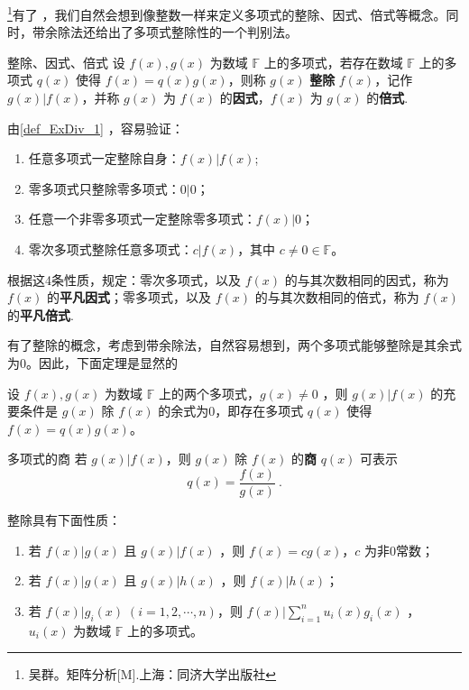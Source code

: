 

\footnote{吴群。矩阵分析[M].上海：同济大学出版社}有了 ，我们自然会想到像整数一样来定义多项式的整除、因式、倍式等概念。同时，带余除法还给出了多项式整除性的一个判别法。
\begin{definition}{整除、因式、倍式}\label{def_ExDiv_1}
设 $f(x),g(x)$ 为数域 $\mathbb{F}$ 上的多项式，若存在数域 $\mathbb{F}$ 上的多项式 $q(x)$ 使得 $f(x)=q(x)g(x)$，则称 $g(x)$ \textbf{整除} $f(x)$，记作 $g(x)|f(x)$，并称 $g(x)$ 为 $f(x)$ 的\textbf{因式}，$f(x)$ 为 $g(x)$ 的\textbf{倍式}.
\end{definition}
由\autoref{def_ExDiv_1} ，容易验证：
\begin{enumerate}
\item 任意多项式一定整除自身：$f(x)|f(x)$;
\item 零多项式只整除零多项式：$0|0$；
\item 任意一个非零多项式一定整除零多项式：$f(x)|0$；
\item 零次多项式整除任意多项式：$c|f(x)$，其中 $c\neq0\in\mathbb{F}$。
\end{enumerate}
根据这4条性质，规定：零次多项式，以及 $f(x)$ 的与其次数相同的因式，称为 $f(x)$ 的\textbf{平凡因式}；零多项式，以及 $f(x)$ 的与其次数相同的倍式，称为 $f(x)$ 的\textbf{平凡倍式}.

有了整除的概念，考虑到带余除法，自然容易想到，两个多项式能够整除是其余式为0。因此，下面定理是显然的
\begin{theorem}{}
设 $f(x),g(x)$ 为数域 $\mathbb{F}$ 上的两个多项式，$g(x)\neq 0$ ，则 $g(x)|f(x)$ 的充要条件是 $g(x)$ 除 $f(x)$ 的余式为0，即存在多项式 $q(x)$ 使得 $f(x)=q(x)g(x)$。
\end{theorem}
\begin{definition}{多项式的商}
若 $g(x)|f(x)$，则 $g(x)$ 除 $f(x)$ 的\textbf{商} $q(x)$ 可表示 
\begin{equation}
q(x)=\frac{f(x)}{g(x)}~.
\end{equation}

\end{definition}

整除具有下面性质：
\begin{enumerate}
\item 若 $f(x)|g(x)$ 且 $g(x)|f(x)$ ，则 $f(x)=cg(x)$，$c$ 为非0常数；
\item 若 $f(x)|g(x)$ 且 $g(x)|h(x)$ ，则 $f(x)|h(x)$；
\item 若 $f(x)|g_i(x)\;(i=1,2,\cdots,n)$，则 $f(x)|\sum\limits_{i=1}^{n}u_i(x)g_i(x)$ ， $u_i(x)$ 为数域 $\mathbb{F}$ 上的多项式。
\end{enumerate}

